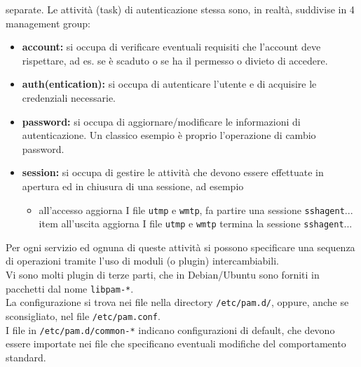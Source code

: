 \documentclass[a4paper]{report}
\begin{document}
separate. Le attività (task) di autenticazione stessa sono, in realtà,
suddivise in 4 management group:
\begin{itemize}
\item \textbf{account:} si occupa di verificare eventuali requisiti che l'account deve
rispettare, ad es. se è scaduto o se ha il permesso o divieto di accedere.
\item \textbf{auth(entication):} si occupa di autenticare l'utente e di acquisire le credenziali
necessarie.
\item \textbf{password:} si occupa di aggiornare/modificare le informazioni di
autenticazione. Un classico esempio è proprio l'operazione di cambio
password.
\item \textbf{session:} si occupa di gestire le attività che devono essere effettuate in
apertura ed in chiusura di una sessione, ad esempio
\begin{itemize}
\item all'accesso aggiorna I file \texttt{utmp} e \texttt{wmtp}, fa partire una sessione \texttt{sshagent}...
item all'uscita aggiorna I file \texttt{utmp} e \texttt{wmtp} termina la sessione \texttt{sshagent}...
\end{itemize}
\end{itemize}
Per ogni servizio ed ognuna di queste attività si possono
specificare una sequenza di operazioni tramite l'uso di moduli
(o plugin) intercambiabili.\\
Vi sono molti plugin di terze parti, che in Debian/Ubuntu sono
forniti in pacchetti dal nome \texttt{libpam-*}.\\
La configurazione si trova nei file nella directory
\texttt{/etc/pam.d/}, oppure, anche se sconsigliato, nel file
\texttt{/etc/pam.conf}.\\
I file in \texttt{/etc/pam.d/common-*}
indicano configurazioni
di default, che devono essere importate nei file che specificano
eventuali modifiche del comportamento standard.\\
\end{document}
